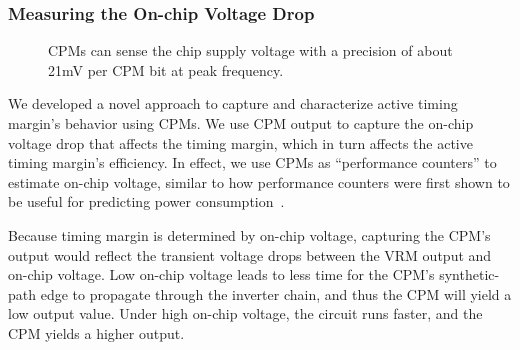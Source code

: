 \subsubsection{Measuring the On-chip Voltage Drop}
\label{sec:ams:rootcause:cpm-measurement}

\begin{figure}[t]
\centering
\caption{CPMs can sense the chip supply voltage with a precision of about 21mV per CPM bit at peak frequency.}
\label{fig:cpm-analysis}
\end{figure}

We developed a novel approach to capture and characterize active timing margin's behavior using CPMs. We use CPM output to capture the on-chip voltage drop that affects the timing margin, which in turn affects the active timing margin's efficiency. In effect, we use CPMs as ``performance counters'' to estimate on-chip voltage, similar to how performance counters were first shown to be useful for predicting power consumption~\cite{isci2003runtime,huang2012accurate}.

Because timing margin is determined by on-chip voltage, capturing the CPM's output would reflect the transient voltage drops between the VRM output and on-chip voltage. Low on-chip voltage leads to less time for the CPM's synthetic-path edge to propagate through the inverter chain, and thus the CPM will yield a low output value. Under high on-chip voltage, the circuit runs faster, and the CPM yields a higher output.

